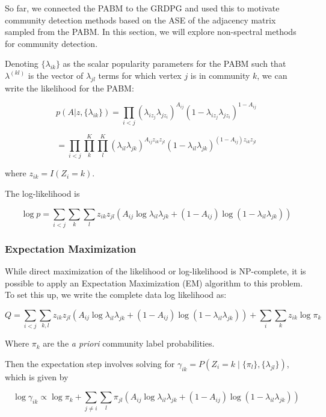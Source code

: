 \documentclass[
  11pt,
]{article}
\begin{document}
So far, we connected the PABM to the GRDPG and used this to motivate
community detection methods based on the ASE of the adjacency matrix
sampled from the PABM. In this section, we will explore non-spectral
methods for community detection.

Denoting \(\{\lambda_{ik}\}\) as the scalar popularity parameters for
the PABM such that \(\lambda^{(kl)}\) is the vector of \(\lambda_{jl}\)
terms for which vertex \(j\) is in community \(k\), we can write the
likelihood for the PABM:

\[p(A | z, \{\lambda_{ik}\}) = 
\prod_{i < j} (\lambda_{i z_j} \lambda_{j z_i})^{A_{ij}} 
(1 - \lambda_{i z_j} \lambda_{j z_i})^{1 - A_{ij}}\]

\begin{equation}
= \prod_{i < j} \prod_k^K \prod_l^K 
(\lambda_{il} \lambda_{jk})^{A_{ij} z_{ik} z_{jl}} 
(1 - \lambda_{il} \lambda_{jk})^{(1 - A_{ij}) z_{ik} z_{jl}}
\end{equation}

where \(z_{ik} = I(Z_i = k)\).

The log-likelihood is

\begin{equation}
\log p = \sum_{i < j} \sum_k \sum_l z_{ik} z_{jl} 
(A_{ij} \log \lambda_{il} \lambda_{jk} + 
(1 - A_{ij}) \log (1 - \lambda_{il} \lambda_{jk}))
\end{equation}

\hypertarget{expectation-maximization}{%
\subsubsection{Expectation
Maximization}\label{expectation-maximization}}

While direct maximization of the likelihood or log-likelihood is
NP-complete, it is possible to apply an Expectation Maximization (EM)
algorithm to this problem. To set this up, we write the complete data
log likelihood as:

\[Q = 
\sum_{i < j} \sum_{k, l} z_{ik} z_{jl} (A_{ij} \log \lambda_{il} \lambda_{jk} +
(1 - A_{ij}) \log(1 - \lambda_{il} \lambda_{jk}))
+ \sum_i \sum_k z_{ik} \log \pi_k\]

Where \(\pi_k\) are the \emph{a priori} community label probabilities.

Then the expectation step involves solving for
\(\gamma_{ik} = P(Z_i = k \mid \{\pi_l\}, \{\lambda_{jl}\})\), which is
given by

\[\log \gamma_{ik} \propto 
\log \pi_k + 
\sum_{j \neq i} \sum_l \pi_{jl} (A_{ij} \log \lambda_{il} \lambda_{jk} + 
(1 - A_{ij}) \log(1 - \lambda_{il} \lambda_{jk}))\]
\end{document}
